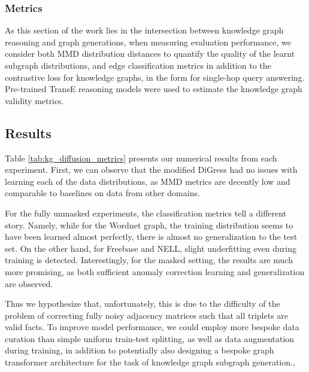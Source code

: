 \subsubsection{Metrics}

As this section of the work lies in the intersection between knowledge graph reasoning and graph generations, when measuring evaluation performance, we consider both MMD distribution distances to quantify the quality of the learnt subgraph distributions, and edge classification metrics in addition to the contrastive loss for knowledge graphs, in the form for single-hop query answering. Pre-trained TransE \cite{bordes_translating_2013} reasoning models were used to estimate the knowledge graph validity metrics.

\subsection{Results}

Table \ref{tab:kg_diffusion_metrics} presents our numerical results from each experiment. First, we can observe that the modified DiGress had no issues with learning each of the data distributions, as MMD metrics are decently low and comparable to baselines on data from other domains. 

For the fully unmasked experiments, the classification metrics tell a different story. Namely, while for the Wordnet graph, the training distribution seems to have been learned almost perfectly, there is almost no generalization to the test set. On the other hand, for Freebase and NELL, slight underfitting even during training is detected. Interestingly, for the masked setting, the results are much more promising, as both sufficient anomaly correction learning and generalization are observed. 

Thus we hypothesize that, unfortunately, this is due to the difficulty of the problem of correcting fully noisy adjacency matrices such that all triplets are valid facts. To improve model performance, we could employ more bespoke data curation than simple uniform train-test splitting, as well as data augmentation during training, in addition to potentially also designing a bespoke graph transformer architecture for the task of knowledge graph subgraph generation.,

